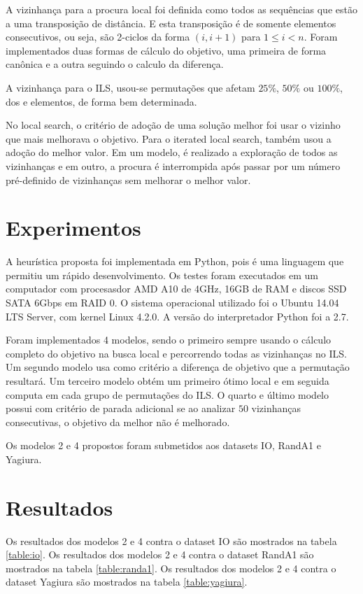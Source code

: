\documentclass[a4paper,10pt,onecolumn]{article}
\begin{document}
A vizinhança para a procura local foi definida como todos as sequências que
estão a uma transposição de distância. E esta transposição é de somente
elementos consecutivos, ou seja, são 2-ciclos da forma $(i,i+1)$ para $1\leq
i<n$.  Foram implementados duas formas de cálculo do objetivo, uma primeira de
forma canônica e a outra seguindo o calculo da diferença\cite{tommaso}.

A vizinhança para o ILS, usou-se permutações que afetam $25\%$, $50\%$ ou
$100\%$, dos e elementos, de forma bem determinada. 

No local search, o critério de adoção de uma solução melhor foi usar o vizinho
que mais melhorava o objetivo.  Para o iterated local search, também usou a
adoção do melhor valor. Em um modelo, é realizado a exploração de todos as
vizinhanças e em outro, a procura é interrompida após passar por um número
pré-definido de vizinhanças sem melhorar o melhor valor.

\section{Experimentos}

A heurística proposta foi implementada em Python, pois é uma
linguagem que permitiu um rápido desenvolvimento.  Os testes foram executados
em um computador com procesasdor AMD A10 de 4GHz, 16GB de RAM e discos SSD
SATA 6Gbps em RAID 0.  O sistema operacional utilizado foi o Ubuntu 14.04 LTS
Server, com kernel Linux 4.2.0.  A versão do interpretador Python foi a 2.7.

Foram implementados 4 modelos, sendo o primeiro sempre usando o cálculo
completo do
objetivo na busca local e percorrendo todas as vizinhanças no ILS. Um segundo
modelo usa como critério a diferença de objetivo que a permutação resultará.
Um terceiro modelo obtém um primeiro ótimo local e em seguida computa em cada
grupo de permutações do ILS.  O quarto e último modelo possui com critério de
parada adicional se ao analizar $50$ vizinhanças consecutivas, o objetivo da
melhor não é melhorado.

Os modelos 2 e 4 propostos foram submetidos aos datasets IO\cite{ds_io},
RandA1\cite{ds_randa1} e Yagiura\cite{ds_yagiura}.

\section{Resultados}

Os resultados dos modelos 2 e 4 contra o dataset IO são mostrados na tabela
\ref{table:io}.
Os resultados dos modelos 2 e 4 contra o dataset RandA1 são mostrados na tabela
\ref{table:randa1}.
Os resultados dos modelos 2 e 4 contra o dataset Yagiura são mostrados na tabela
\ref{table:yagiura}.
\end{document}
